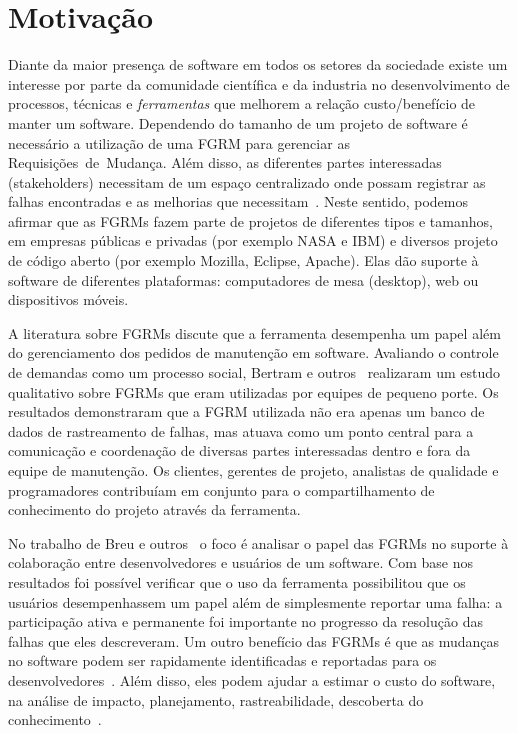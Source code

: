 \section{Motivação}
\label{sec:intro-motivacao}

Diante da maior presença de software em todos os setores da sociedade existe um
interesse por parte da comunidade científica e da industria no desenvolvimento
de processos, técnicas e \textit{ferramentas} que melhorem a relação
custo/benefício de manter um software. Dependendo do tamanho de um projeto de
software é necessário a utilização de uma FGRM para gerenciar as
Requisições~de~Mudança. Além disso, as diferentes partes interessadas
(stakeholders) necessitam de um espaço centralizado onde possam registrar as
falhas encontradas e as melhorias que necessitam~\cite{1407819}. Neste sentido,
podemos afirmar que as FGRMs fazem parte de projetos de diferentes tipos e
tamanhos, em empresas públicas e privadas (por exemplo NASA e IBM) e diversos
projeto de código aberto (por exemplo Mozilla, Eclipse, Apache). Elas dão
suporte à software de diferentes plataformas: computadores de mesa (desktop),
web ou dispositivos móveis.


A literatura sobre FGRMs discute que a ferramenta desempenha um papel além do
gerenciamento dos pedidos de manutenção em software. Avaliando o controle de
demandas como um processo social, Bertram e
outros~\cite{Bertram:2010:CCB:1718918.1718972} realizaram um estudo qualitativo
sobre FGRMs que eram utilizadas por equipes de pequeno porte. Os resultados
demonstraram que a FGRM utilizada não era apenas um banco de dados de
rastreamento de falhas, mas atuava como um ponto central para a comunicação e
coordenação de diversas partes interessadas dentro e fora da
equipe de manutenção. Os clientes, gerentes de projeto, analistas de qualidade e
programadores contribuíam em conjunto para o compartilhamento de conhecimento do
projeto através da ferramenta.

No trabalho de Breu e outros~\cite{Breu:2010:INB:1718918.1718973} o foco é
analisar o papel das FGRMs no suporte à colaboração entre desenvolvedores e
usuários de um software. Com base nos resultados foi possível verificar que o
uso da ferramenta possibilitou que os usuários desempenhassem um papel além de
simplesmente reportar uma falha: a participação ativa e permanente foi
importante no progresso da resolução das falhas que eles descreveram. Um outro
benefício das FGRMs é que as mudanças no software podem ser rapidamente
identificadas e reportadas para os desenvolvedores~\cite{anvik2005coping}. Além
disso, eles podem ajudar a estimar o custo do software, na análise de impacto,
planejamento, rastreabilidade, descoberta do
conhecimento~\cite{cavalcanti2013bug}.

